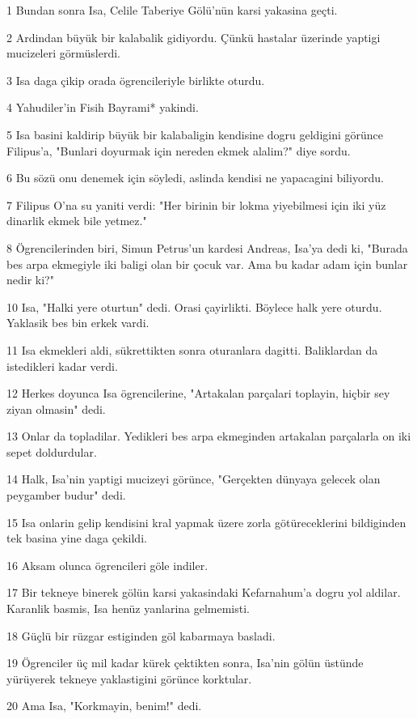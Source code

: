 \par 1 Bundan sonra Isa, Celile Taberiye Gölü'nün karsi yakasina geçti.
\par 2 Ardindan büyük bir kalabalik gidiyordu. Çünkü hastalar üzerinde yaptigi mucizeleri görmüslerdi.
\par 3 Isa daga çikip orada ögrencileriyle birlikte oturdu.
\par 4 Yahudiler'in Fisih Bayrami* yakindi.
\par 5 Isa basini kaldirip büyük bir kalabaligin kendisine dogru geldigini görünce Filipus'a, "Bunlari doyurmak için nereden ekmek alalim?" diye sordu.
\par 6 Bu sözü onu denemek için söyledi, aslinda kendisi ne yapacagini biliyordu.
\par 7 Filipus O'na su yaniti verdi: "Her birinin bir lokma yiyebilmesi için iki yüz dinarlik ekmek bile yetmez."
\par 8 Ögrencilerinden biri, Simun Petrus'un kardesi Andreas, Isa'ya dedi ki, "Burada bes arpa ekmegiyle iki baligi olan bir çocuk var. Ama bu kadar adam için bunlar nedir ki?"
\par 10 Isa, "Halki yere oturtun" dedi. Orasi çayirlikti. Böylece halk yere oturdu. Yaklasik bes bin erkek vardi.
\par 11 Isa ekmekleri aldi, sükrettikten sonra oturanlara dagitti. Baliklardan da istedikleri kadar verdi.
\par 12 Herkes doyunca Isa ögrencilerine, "Artakalan parçalari toplayin, hiçbir sey ziyan olmasin" dedi.
\par 13 Onlar da topladilar. Yedikleri bes arpa ekmeginden artakalan parçalarla on iki sepet doldurdular.
\par 14 Halk, Isa'nin yaptigi mucizeyi görünce, "Gerçekten dünyaya gelecek olan peygamber budur" dedi.
\par 15 Isa onlarin gelip kendisini kral yapmak üzere zorla götüreceklerini bildiginden tek basina yine daga çekildi.
\par 16 Aksam olunca ögrencileri göle indiler.
\par 17 Bir tekneye binerek gölün karsi yakasindaki Kefarnahum'a dogru yol aldilar. Karanlik basmis, Isa henüz yanlarina gelmemisti.
\par 18 Güçlü bir rüzgar estiginden göl kabarmaya basladi.
\par 19 Ögrenciler üç mil kadar kürek çektikten sonra, Isa'nin gölün üstünde yürüyerek tekneye yaklastigini görünce korktular.
\par 20 Ama Isa, "Korkmayin, benim!" dedi.

